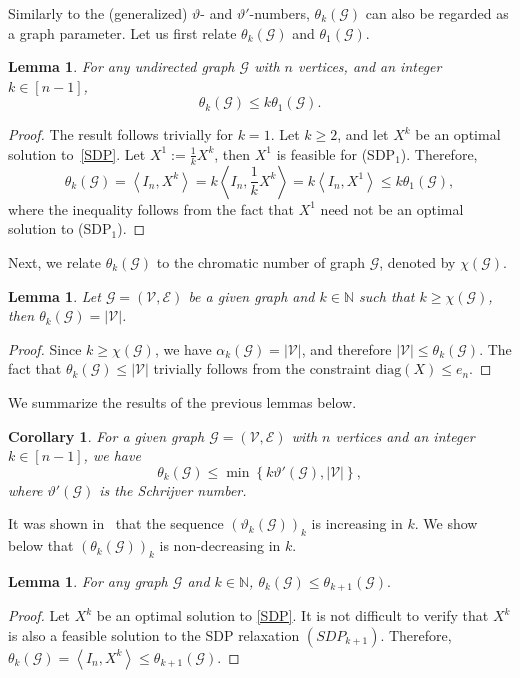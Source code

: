 \documentclass[11pt, a4paper]{article}
\newtheorem{corollary}{Corollary}[theorem]
\newtheorem{lemma}[theorem]{Lemma}
\newcommand{\diag}[1]{{\text{diag}\left(#1\right)}}
\newcommand{\IP}[2]{\left\langle #1, #2 \right\rangle}
\newcommand{\mc}{\mathcal}
\begin{document}
Similarly to the (generalized) $\vartheta$- and $\vartheta'$-numbers,  $\theta_k(\mc{G})$ can also be regarded as a graph parameter. 
Let us first relate  $\theta_k(\mc{G})$ and  $\theta_1(\mc{G})$.
\begin{lemma} \label{Lemma1}
    For any undirected graph $\mc{G}$ with $n$ vertices, and an integer $k\in [n-1]$,  
    $$\theta_k(\mc{G}) \leq  k \theta_1(\mc{G}).$$
\end{lemma}
\begin{proof}
    The result follows trivially for $k=1$.
    Let $k\geq 2$, and let $X^k$ be an optimal solution to~\eqref{SDP}.
    Let $X^1:= \frac{1}{k}X^k$, then $X^1$ is feasible for (SDP$_1$). 
    Therefore,
    $$\theta_k(\mc{G}) = \IP{I_n}{X^k} = k\IP{I_n}{\frac{1}{k} X^k} =  k\IP{I_n}{X^1} \leq k  \theta_1(\mc{G}),$$
    where the inequality follows from the fact that $X^1$ need not be an optimal solution to (SDP$_1$).
\end{proof}

Next, we relate $\theta_k(\mathcal{G})$ to the chromatic number of graph $\mathcal{G}$, denoted by $\chi(\mathcal{G})$.
\begin{lemma}\label{Lemma2}
    Let $\mc{G}=(\mc{V},\mc{E})$  be a given graph and  $k \in \mathbb{N}$ such that $k\geq \chi( \mc{G} )$, then $\theta_k(\mc{G}) = |\mc{V}|$.
\end{lemma}
\begin{proof}
    Since  $k\geq \chi( \mc{G} )$, we have $\alpha_k(\mc{G}) = |\mc{V}|$, and therefore 
    $|\mc{V}| \leq  \theta_k(\mc{G})$. 
    The fact that $\theta_k(\mc{G})\leq |\mc{V}|$ trivially follows from the constraint $\diag{X} \leq e_n$.
\end{proof}

We summarize the results of the previous lemmas below.
\begin{corollary} \label{Cor1}
For a given graph $\mc{G}=(\mc{V},\mc{E})$ with $n$ vertices and an integer $k\in [n-1]$, we have
$$\theta_k(\mc{G}) \leq \min \left \{ k \vartheta'(\mc{G}), |\mc{V}|\right \},$$
where $\vartheta'(\mc{G})$ is the Schrijver number.
\end{corollary}

It was shown in~\cite{Sinjorgo2022GenVartheta} that the sequence   
$\left ( \vartheta_k (\mc{G}) \right )_k$ is increasing in $k$.
We show below that  $\left (\theta_k(\mc{G}) \right )_k$ is non-decreasing in $k$.

\begin{lemma}
    For any graph $\mc{G}$ and $k \in \mathbb{N}$, $\theta_k(\mc{G}) \leq \theta_{k+1}(\mc{G}).$
\end{lemma}
\begin{proof}
    Let $X^{k}$ be an optimal solution to \eqref{SDP}.
    It is not difficult to verify that $X^{k}$ is also a feasible solution to the SDP relaxation $(SDP_{k+1})$.
    Therefore, $\theta_k(\mc{G}) =  \IP{I_n}{X^k} \leq \theta_{k+1}(\mc{G})$.
\end{proof}
\end{document}
